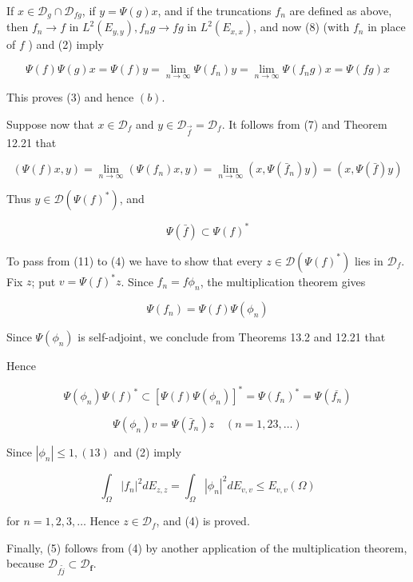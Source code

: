 \documentclass[10pt]{article}
\begin{document}
If $x \in \mathscr{D}_{g} \cap \mathscr{D}_{f g}$, if $y=\Psi(g) x$, and if the truncations $f_{n}$ are defined as above, then $f_{n} \rightarrow f$ in $L^{2}\left(E_{y, y}\right), f_{n} g \rightarrow f g$ in $L^{2}\left(E_{x, x}\right)$, and now (8) (with $f_{n}$ in place of $f$ ) and (2) imply

$$
\Psi(f) \Psi(g) x=\Psi(f) y=\lim _{n \rightarrow \infty} \Psi\left(f_{n}\right) y=\lim _{n \rightarrow \infty} \Psi\left(f_{n} g\right) x=\Psi(f g) x
$$

This proves (3) and hence $(b)$.

Suppose now that $x \in \mathscr{D}_{f}$ and $y \in \mathscr{D}_{\vec{f}}=\mathscr{D}_{f}$. It follows from (7) and Theorem 12.21 that

$$
(\Psi(f) x, y)=\lim _{n \rightarrow \infty}\left(\Psi\left(f_{n}\right) x, y\right)=\lim _{n \rightarrow \infty}\left(x, \Psi\left(\bar{f}_{n}\right) y\right)=(x, \Psi(\bar{f}) y)
$$

Thus $y \in \mathscr{D}\left(\Psi(f)^{*}\right)$, and

$$
\Psi(\bar{f}) \subset \Psi(f)^{*}
$$

To pass from (11) to (4) we have to show that every $z \in \mathscr{D}\left(\Psi(f)^{*}\right)$ lies in $\mathscr{D}_{f}$. Fix $z$; put $v=\Psi(f)^{*} z$. Since $f_{n}=f \phi_{n}$, the multiplication theorem gives

$$
\Psi\left(f_{n}\right)=\Psi(f) \Psi\left(\phi_{n}\right)
$$

Since $\Psi\left(\phi_{n}\right)$ is self-adjoint, we conclude from Theorems 13.2 and 12.21 that

Hence

$$
\Psi\left(\phi_{n}\right) \Psi(f)^{*} \subset\left[\Psi(f) \Psi\left(\phi_{n}\right)\right]^{*}=\Psi\left(f_{n}\right)^{*}=\Psi\left(\overline{f_{n}}\right)
$$

$$
\Psi\left(\phi_{n}\right) v=\Psi\left(\bar{f}_{n}\right) z \quad(n=1,23, \ldots)
$$

Since $\left|\phi_{n}\right| \leq 1,(13)$ and (2) imply

$$
\int_{\Omega}\left|f_{n}\right|^{2} d E_{z, z}=\int_{\Omega}\left|\phi_{n}\right|^{2} d E_{v, v} \leq E_{v, v}(\Omega)
$$

for $n=1,2,3, \ldots$ Hence $z \in \mathscr{D}_{f}$, and (4) is proved.

Finally, (5) follows from (4) by another application of the multiplication theorem, because $\mathscr{D}_{f \tilde{j}} \subset \mathscr{D}_{\boldsymbol{f}}$.
\end{document}
